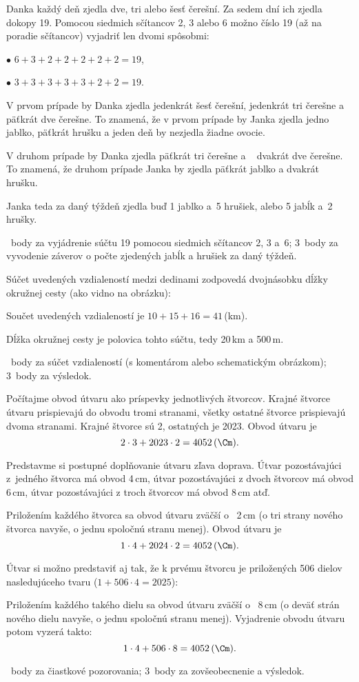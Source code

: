 {%
Danka každý deň zjedla dve, tri alebo šesť čerešní.
Za sedem dní ich zjedla dokopy 19. Pomocou siedmich sčítancov 2, 3 alebo 6 možno číslo 19 (až na poradie sčítancov) vyjadriť len dvomi spôsobmi:

\smallskip
  \item{$\bullet$} $6+3+2+2+2+2+2=19$,
  \item{$\bullet$} $3+3+3+3+3+2+2=19$.

\smallskip\noindent
V prvom prípade by Danka zjedla jedenkrát šesť čerešní, jedenkrát tri čerešne a päťkrát dve čerešne.
To znamená, že v prvom prípade by Janka zjedla jedno jablko, päťkrát hrušku a jeden deň by nezjedla žiadne ovocie.

V druhom prípade by Danka zjedla päťkrát tri čerešne a ~ dvakrát dve čerešne.
To znamená, že druhom prípade Janka by zjedla päťkrát jablko a dvakrát hrušku.

Janka teda za daný týždeň zjedla buď 1 jablko a~5 hrušiek, alebo 5 jabĺk a~2 hrušky.

~body za vyjádrenie súčtu 19 pomocou siedmich sčítancov 2, 3 a~6;
3~body za vyvodenie záverov o počte zjedených jabĺk a hrušiek za daný týždeň.

\endhodnotenie
}

{%
Súčet uvedených vzdialeností medzi dedinami zodpovedá dvojnásobku dĺžky okružnej cesty (ako vidno na obrázku):
%

Součet uvedených vzdialeností je $10+15+16 =41$\,(km).

Dĺžka okružnej cesty je polovica tohto súčtu, tedy 20\,km a 500\,m.

~body za súčet vzdialeností (s komentárom alebo schematickým obrázkom);
3~body za výsledok.
\endhodnotenie
}

{%
Počítajme obvod útvaru ako príspevky jednotlivých štvorcov. Krajné štvorce útvaru prispievajú do obvodu tromi stranami, všetky ostatné štvorce prispievajú dvoma stranami.
Krajné štvorce sú 2, ostatných je 2023.
Obvod útvaru je
$$
2\cdot3 + 2023\cdot2 = 4052\,(\Cm).
$$

\ineriesenie
Predstavme si postupné doplňovanie útvaru zľava doprava.
Útvar pozostávajúci z~jedného štvorca má obvod 4\,cm,
útvar pozostávajúci z dvoch štvorcov má obvod 6\,cm,
útvar pozostávajúci z troch štvorcov má obvod 8\,cm atď.

Priložením každého štvorca sa obvod útvaru zväčší o ~2\,cm (o tri strany nového štvorca navyše, o jednu spoločnú stranu menej).
Obvod útvaru je
$$
1\cdot4 + 2024\cdot2 = 4052\,(\Cm).
$$

\poznamka
Útvar si možno predstaviť aj tak, že k prvému štvorcu je priložených 506 dielov nasledujúceho tvaru ($1+506\cdot4=2025$):
%

Priložením každého takého dielu sa obvod útvaru zväčší o ~8\,cm (o deväť strán nového dielu navyše, o jednu spoločnú stranu menej).
Vyjadrenie obvodu útvaru potom vyzerá takto:
$$
1\cdot4 + 506\cdot8 = 4052\,(\Cm).
$$

~body za čiastkové pozorovania; %
3~body za zovšeobecnenie a výsledok.
\endhodnotenie
}

